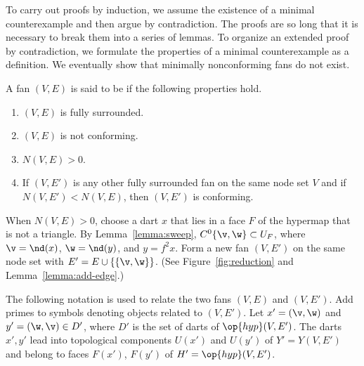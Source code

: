 To carry out proofs by induction, we assume the existence of a minimal
counterexample and then argue by contradiction.  The proofs are so
long that it is necessary to break them into a series of lemmas.  To
organize an extended proof by contradiction, we formulate the
properties of a minimal counterexample as a definition.  We eventually
show that minimally nonconforming fans do not exist.

\begin{definition}
A fan $(V,E)$ is said to be  if
the following properties hold.
\begin{enumerate}\wasitemize 
\item $(V,E)$ is fully surrounded.
\item $(V,E)$ is not conforming.
\item $N(V,E)>0$.
\item If $(V,E')$ is any other fully surrounded fan on the same node
set $V$ and if $N(V,E') < N(V,E)$, then $(V,E')$ is conforming.
\end{enumerate}\wasitemize 
\end{definition}




\begin{remark}\label{remark:reduction}
  When $N(V,E)>0$, choose a dart $x$ that lies in a face $F$ of the
  hypermap that is not a triangle.  By Lemma~\ref{lemma:sweep},
  $C^0\{\v,\w\}\subset U_F$, where $\v=\nd(x)$, $\w=\nd(y)$, and
  $y=f^2 x$.  Form a new fan $(V,E')$ on the same node set with $E' =
  E\cup \{\{\v,\w\}\}$.  (See Figure~\ref{fig:reduction} and Lemma~\ref{lemma:add-edge}.)

\figRNMBPJD %

The following notation is used to relate the two fans $(V,E)$ and $(V,E')$.  
Add primes to symbols
denoting objects related to $(V,E')$.
Let $x'=(\v,\w)$ and $y'=(\w,\v)\in D'$, where $D'$ is the set of darts of $\op{hyp}(V,E')$.
The darts $x',y'$ lead into topological components
$U(x')$ and $U(y')$ of $Y'=Y(V,E')$ and belong to faces $F(x')$,
$F(y')$ of $H'=\op{hyp}(V,E')$.
\end{remark}

